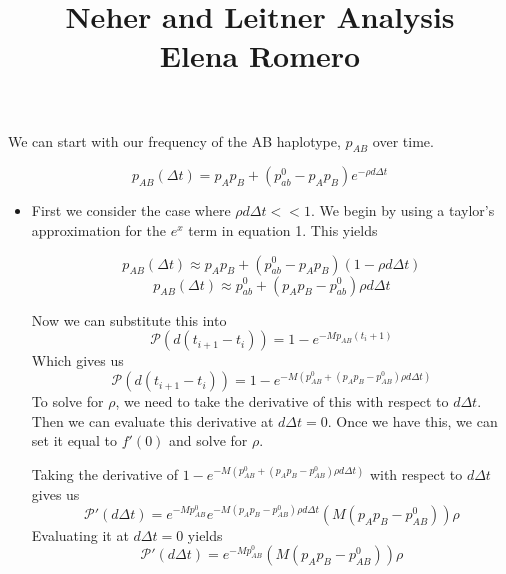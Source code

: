 \documentclass[12pt]{article}
\begin{document}
\title{\large \sc Neher and Leitner Analysis
\\ Elena Romero}
\maketitle
\vskip-10pt

We can start with our frequency of the AB haplotype, $p_{AB}$ over time.

\begin{equation}
p_{AB}(\Delta t) = p_A p_B + (p_{ab}^0 - p_Ap_B)e^{- \rho d \Delta t}
\end{equation}

\begin{itemize}
\item First we consider the case where $\rho d \Delta t << 1$. We begin by using a taylor's approximation for the $e^x$ term in equation 1. This yields

\[p_{AB}(\Delta t)  \approx p_A p_B + (p_{ab}^0 - p_Ap_B)(1 - \rho d \Delta t)\]
\[p_{AB}(\Delta t)  \approx p_{ab}^0 + (p_Ap_B - p_{ab}^0) \rho d \Delta t\]

Now we can substitute this into 
\[\mathcal{P}(d(t_{i+1}-t_i)) = 1 - e^{-Mp_{AB}{(t_i + 1)}}\]
Which gives us 
\[\mathcal{P}(d(t_{i+1}-t_i)) = 1 - e^{- M(p_{AB}^0 + (p_Ap_B - p_{AB}^0)\rho d \Delta t)}\]
To solve for $\rho$, we need to take the derivative of this with respect to $d \Delta t$. Then we can evaluate this derivative at $d \Delta t = 0$. Once we have this, we can set it equal to $f'(0)$ and solve for $\rho$.

Taking the derivative of $1 - e^{- M(p_{AB}^0 + (p_Ap_B - p_{AB}^0)\rho d \Delta t)}$ with respect to $d\Delta t$ gives us
\[\mathcal{P}'(d \Delta t) = e^{-Mp_{AB}^0}e^{-M(p_Ap_B - p_{AB}^0)\rho d \Delta t}(M(p_Ap_B - p_{AB}^0))\rho\]
Evaluating it at $d \Delta t = 0$ yields
\begin{equation}\mathcal{P}'(d \Delta t) = e^{-Mp_{AB}^0}(M(p_Ap_B - p_{AB}^0))\rho\end{equation}


\end{itemize}
\end{document}
